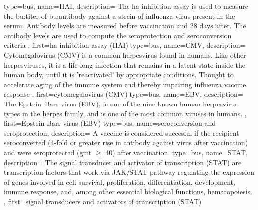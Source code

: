 {
    type=bus,
    name=HAI,
    description={
        The \acrlong{ha} inhibition assay is used to measure the \gls{bu:titer} of \gls{bu:antibody} against a strain of influenza virus present in the serum.
        Antibody levels are measured before vaccination and 28 days after.
        The antibody levels are used to compute the seroprotection and seroconversion criteria
    },
    first={\acrlong{ha} inhibition assay (HAI)}
}
{
    type=bus,
    name=CMV,
    description={
        Cytomegalovirus (CMV) is a common herpesvirus found in humans.
        Like other herpesviruses, it is a life-long infection that remains in a latent state inside the human body, until it is 'reactivated' by appropriate conditions.
        Thought to accelerate aging of the immune system and thereby impairing influenza vaccine response  \citep{van_den_Berg_2019}
    },
    first={cytomegalovirus (CMV)}
}
{
    type=bus,
    name=EBV,
    description={
        The Epstein–Barr virus (EBV), is one of the nine known human herpesvirus types in the herpes family, and is one of the most common viruses in humans.
    },
    first={Epstein-Barr virus (EBV)}
}
{
    type=bus,
    name=seroconversion and seroprotection,
    description={
        A vaccine is considered succesful if the recipient seroconverted (4-fold or greater rise in antibody against virus after vaccination) and were seroprotected (\acrshort{gmt} \(\ge\) 40) after vaccination.
    }
}
{
    type=bus,
    name=STAT,
    description={
        The signal transducer and activator of transcription (STAT) are transcription factors that work via JAK/STAT pathway regulating the expression of genes involved in cell survival, proliferation, differentiation, development, immune response, and, among other essential biological functions, hematopoiesis.
    },
    first={signal transducers and activators of transcription (STAT)}
}


